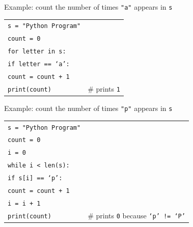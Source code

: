 \documentclass[t,handout,9pt]{beamer}
\begin{document}
\begin{frame}
\vfill
Example: count the number of times \texttt{"a"} appears in \texttt{s}
\begin{table}[]
\begin{flushleft}
\begin{tabular}{ll}
\texttt{s = "Python Program"} &  \\
\texttt{count = 0} &  \\
\texttt{for letter in s:} &  \\
\texttt{\qquad if letter == `a':} &  \\
\texttt{\qquad\qquad count = count + 1} &  \\
\texttt{print(count)} &  \# prints \texttt{1}\\
\end{tabular}
\end{flushleft}
\end{table}
\vfill
Example: count the number of times \texttt{"p"} appears in \texttt{s}
\begin{table}[]
\begin{flushleft}
\begin{tabular}{ll}
\texttt{s = "Python Program"} &  \\
\texttt{count = 0} &  \\
\texttt{i = 0} &  \\
\texttt{while i < len(s):} &  \\
\texttt{\qquad if s[i] == `p':} &  \\
\texttt{\qquad\qquad count = count + 1} &  \\
\texttt{\qquad i = i + 1} &  \\
\texttt{print(count)} &  \# prints \texttt{0} because \texttt{`p' != `P'}\\
\end{tabular}
\end{flushleft}
\end{table}
\vfill
\end{frame}
%
\end{document}
